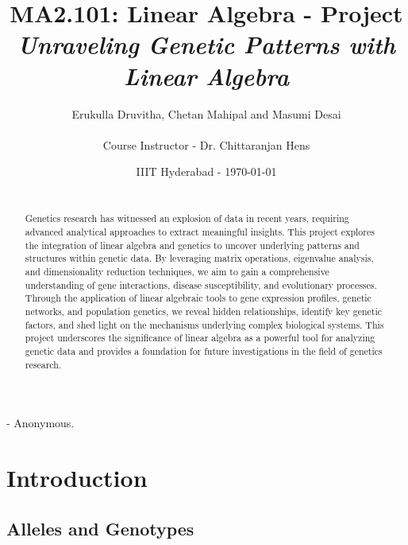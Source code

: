\documentclass[a4paper,12pt]{article}
\begin{document}

\title{MA2.101: Linear Algebra - Project \\ \textbf{\textit{Unraveling Genetic Patterns with Linear Algebra}}} %

\author{Erukulla Druvitha, Chetan Mahipal and Masumi Desai \\ \\ Course Instructor - Dr. Chittaranjan Hens} %
\date{IIIT Hyderabad - \today} %
\maketitle
\textit{} - Anonymous.
\begin{abstract} 
\ \\
Genetics research has witnessed an explosion of data in recent years, requiring advanced analytical approaches to extract meaningful insights. This project explores the integration of linear algebra and genetics to uncover underlying patterns and structures within genetic data. By leveraging matrix operations, eigenvalue analysis, and dimensionality reduction techniques, we aim to gain a comprehensive understanding of gene interactions, disease susceptibility, and evolutionary processes. Through the application of linear algebraic tools to gene expression profiles, genetic networks, and population genetics, we reveal hidden relationships, identify key genetic factors, and shed light on the mechanisms underlying complex biological systems. This project underscores the significance of linear algebra as a powerful tool for analyzing genetic data and provides a foundation for future investigations in the field of genetics research.

\end{abstract}
\section{Introduction}
\subsection{Alleles and Genotypes}
\end{document}
